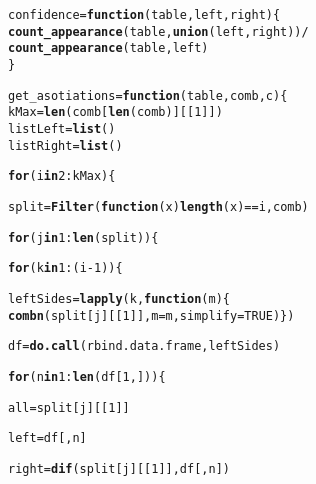 \documentclass[12pt]{report}\usepackage[]{graphicx}\usepackage[dvipsnames]{xcolor}
\makeatletter
\newcommand{\hlnum}[1]{\textcolor[rgb]{0.686,0.059,0.569}{#1}}%
\newcommand{\hlopt}[1]{\textcolor[rgb]{0,0,0}{#1}}%
\newcommand{\hlstd}[1]{\textcolor[rgb]{0.345,0.345,0.345}{#1}}%
\newcommand{\hlkwa}[1]{\textcolor[rgb]{0.161,0.373,0.58}{\textbf{#1}}}%
\newcommand{\hlkwb}[1]{\textcolor[rgb]{0.69,0.353,0.396}{#1}}%
\newcommand{\hlkwc}[1]{\textcolor[rgb]{0.333,0.667,0.333}{#1}}%
\newcommand{\hlkwd}[1]{\textcolor[rgb]{0.737,0.353,0.396}{\textbf{#1}}}%
\newenvironment{kframe}{%
 \def\at@end@of@kframe{}%
 \ifinner\ifhmode%
  \def\at@end@of@kframe{\end{minipage}}%
  \begin{minipage}{\columnwidth}%
 \fi\fi%
 \def\FrameCommand##1{\hskip\@totalleftmargin \hskip-\fboxsep
 \colorbox{shadecolor}{##1}\hskip-\fboxsep
     \hskip-\linewidth \hskip-\@totalleftmargin \hskip\columnwidth}%
 \MakeFramed {\advance\hsize-\width
   \@totalleftmargin\z@ \linewidth\hsize
   \@setminipage}}%
 {\par\unskip\endMakeFramed%
 \at@end@of@kframe}
\newenvironment{knitrout}{}{} %
\makeatother
\begin{document}
\begin{knitrout}
\color{fgcolor}\begin{kframe}
\begin{alltt}
\hlstd{confidence} \hlkwb{=} \hlkwa{function}\hlstd{(}\hlkwc{table}\hlstd{,} \hlkwc{left}\hlstd{,} \hlkwc{right}\hlstd{) \{}
        \hlkwd{count_appearance}\hlstd{(table,} \hlkwd{union}\hlstd{(left, right))} \hlopt{/}
                \hlkwd{count_appearance}\hlstd{(table, left)}
\hlstd{\}}

\hlstd{get_asotiations} \hlkwb{=} \hlkwa{function}\hlstd{(}\hlkwc{table}\hlstd{,} \hlkwc{comb}\hlstd{,} \hlkwc{c}\hlstd{) \{}
        \hlstd{kMax} \hlkwb{=} \hlkwd{len}\hlstd{(comb[}\hlkwd{len}\hlstd{(comb)][[}\hlnum{1}\hlstd{]])}
        \hlstd{listLeft} \hlkwb{=} \hlkwd{list}\hlstd{()}
        \hlstd{listRight} \hlkwb{=} \hlkwd{list}\hlstd{()}

        \hlkwa{for} \hlstd{(i} \hlkwa{in} \hlnum{2}\hlopt{:}\hlstd{kMax) \{}

                \hlstd{split} \hlkwb{=} \hlkwd{Filter}\hlstd{(}\hlkwa{function}\hlstd{(}\hlkwc{x}\hlstd{)} \hlkwd{length}\hlstd{(x)}\hlopt{==}\hlstd{i, comb)}

                \hlkwa{for} \hlstd{(j} \hlkwa{in} \hlnum{1}\hlopt{:}\hlkwd{len}\hlstd{(split)) \{}

                        \hlkwa{for} \hlstd{(k} \hlkwa{in} \hlnum{1}\hlopt{:}\hlstd{(i}\hlopt{-}\hlnum{1}\hlstd{)) \{}

                                \hlstd{leftSides} \hlkwb{=} \hlkwd{lapply}\hlstd{(k,} \hlkwa{function}\hlstd{(}\hlkwc{m}\hlstd{) \{}
                                        \hlkwd{combn}\hlstd{(split[j][[}\hlnum{1}\hlstd{]],} \hlkwc{m}\hlstd{=m,} \hlkwc{simplify}\hlstd{=}\hlnum{TRUE}\hlstd{)\})}

                                \hlstd{df} \hlkwb{=} \hlkwd{do.call}\hlstd{(rbind.data.frame, leftSides)}

                                \hlkwa{for} \hlstd{(n} \hlkwa{in} \hlnum{1}\hlopt{:}\hlkwd{len}\hlstd{(df[}\hlnum{1}\hlstd{,])) \{}

                                        \hlstd{all} \hlkwb{=} \hlstd{split[j][[}\hlnum{1}\hlstd{]]}

                                        \hlstd{left} \hlkwb{=} \hlstd{df[,n]}

                                        \hlstd{right} \hlkwb{=} \hlkwd{dif}\hlstd{(split[j][[}\hlnum{1}\hlstd{]], df[,n])}


\end{alltt}
\end{kframe}
\end{knitrout}
\end{document}
